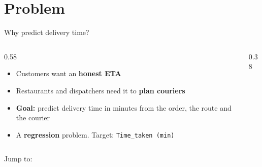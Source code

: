 \documentclass[aspectratio=169,12pt]{beamer}
\begin{document}
\section{Problem}
\begin{frame}[label=s-problem]{Why predict delivery time?}
  \begin{columns}[T]
    \begin{column}{0.58\textwidth}
      \begin{itemize}
        \setlength\itemsep{0.55em}
        \item Customers want an \textbf{honest ETA}
        \item Restaurants and dispatchers need it to \textbf{plan couriers}
        \item \textbf{Goal:} predict delivery time in minutes from the order, the route and the courier
        \item A \textbf{regression} problem. Target: \texttt{Time\_taken (min)}
      \end{itemize}
    \end{column}
    \begin{column}{0.38\textwidth}
      
    \end{column}
  \end{columns}
  \vfill
  \footnotesize\color{grey}Jump to:\ 
    \hyperlink{s-data}{}\ 
    \hyperlink{s-model}{}\ 
    \hyperlink{s-results}{}\ 
    \hyperlink{s-demo}{}
\end{frame}

\end{document}
